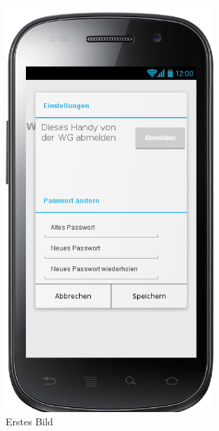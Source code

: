 \begin{figure}[H] 
  \centering
     \includegraphics[width=0.7\textwidth]{anhang/mockups/overviewsettings.png}
  \caption{Erstes Bild}
  \label{fig:Bild1}
\end{figure}

